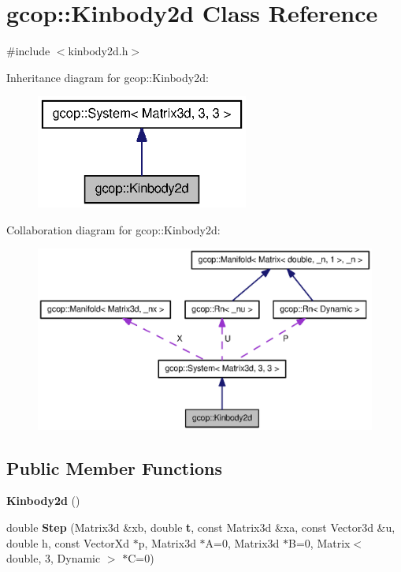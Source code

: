 \section{gcop\-:\-:\-Kinbody2d \-Class \-Reference}
\label{classgcop_1_1Kinbody2d}


{\ttfamily \#include $<$kinbody2d.\-h$>$}



\-Inheritance diagram for gcop\-:\-:\-Kinbody2d\-:\nopagebreak
\begin{figure}[H]
\begin{center}
\leavevmode
\includegraphics[width=198pt]{classgcop_1_1Kinbody2d__inherit__graph}
\end{center}
\end{figure}


\-Collaboration diagram for gcop\-:\-:\-Kinbody2d\-:\nopagebreak
\begin{figure}[H]
\begin{center}
\leavevmode
\includegraphics[width=350pt]{classgcop_1_1Kinbody2d__coll__graph}
\end{center}
\end{figure}
\subsection*{\-Public \-Member \-Functions}
\begin{DoxyCompactItemize}
\item 
{\bf \-Kinbody2d} ()
\item 
double {\bf \-Step} (\-Matrix3d \&xb, double {\bf t}, const \-Matrix3d \&xa, const \-Vector3d \&u, double h, const \-Vector\-Xd $\ast$p, \-Matrix3d $\ast$\-A=0, \-Matrix3d $\ast$\-B=0, \-Matrix$<$ double, 3, \-Dynamic $>$ $\ast$\-C=0)
\end{DoxyCompactItemize}
